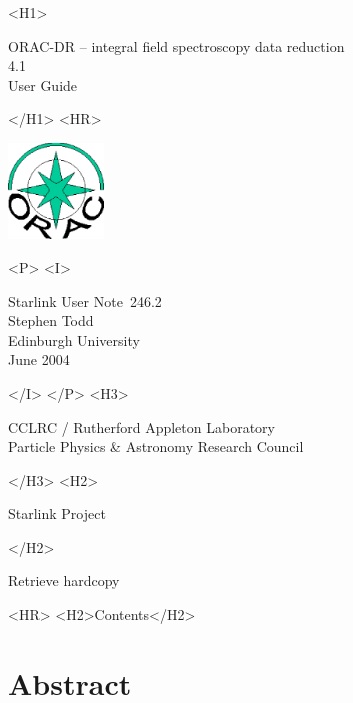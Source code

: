 \documentclass[twoside,11pt]{article}
\newcommand{\stardoccategory}  {Starlink User Note}
\newcommand{\stardocsource}    {sun\stardocnumber}
\newcommand{\stardocnumber}    {246.2}
\newcommand{\stardocauthors}   {Stephen Todd \\
                                Edinburgh University}
\newcommand{\stardocdate}      {June 2004}
\newcommand{\stardoctitle}     {ORAC-DR -- integral field spectroscopy
  data reduction}
\newcommand{\stardocversion}   {4.1}
\newcommand{\stardocmanual}    {User Guide}
\newcommand{\htmladdnormallink}[2]{#1}
\newcommand{\htmladdimg}[1]{}
\newcommand{\htmlref}[2]{#1}
\newcommand{\htmladdtonavigation}[1]{}
\newcommand{\xlabel}[1]{}
\renewcommand{\_}{\texttt{\symbol{95}}}
\begin{document}
\begin{htmlonly}
   \xlabel{}
   \begin{rawhtml} <H1> \end{rawhtml}
      \stardoctitle\\
      \stardocversion\\
      \stardocmanual
   \begin{rawhtml} </H1> <HR> \end{rawhtml}

\includegraphics[width=1.0in]{sun246_logo.eps}

   \begin{rawhtml} <P> <I> \end{rawhtml}
   \stardoccategory\ \stardocnumber \\
   \stardocauthors \\
   \stardocdate
   \begin{rawhtml} </I> </P> <H3> \end{rawhtml}
      \htmladdnormallink{CCLRC / Rutherford Appleton Laboratory}
                        {http://www.cclrc.ac.uk} \\
      \htmladdnormallink{Particle Physics \& Astronomy Research Council}
                        {http://www.pparc.ac.uk} \\
   \begin{rawhtml} </H3> <H2> \end{rawhtml}
      \htmladdnormallink{Starlink Project}{http://www.starlink.rl.ac.uk/}
   \begin{rawhtml} </H2> \end{rawhtml}
   \htmladdnormallink{\htmladdimg{source.gif} Retrieve hardcopy}
      {http://www.starlink.rl.ac.uk/cgi-bin/hcserver?\stardocsource}\\

  \label{stardoccontents}
  \begin{rawhtml} 
    <HR>
    <H2>Contents</H2>
  \end{rawhtml}
  \htmladdtonavigation{\htmlref{\htmladdimg{contents_motif.gif}}
        {stardoccontents}}

  \section{\xlabel{abstract}Abstract}
\end{htmlonly}
\end{document}
